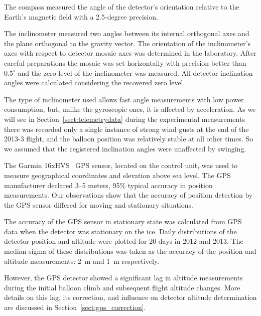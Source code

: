 \documentclass[universe,article,submit,moreauthors,pdftex]{Definitions/mdpi}
\begin{document}
The compass measured the angle of the detector's orientation relative to the Earth's magnetic field with a 2.5-degree precision.

The inclinometer measured two angles between its internal orthogonal axes and the plane orthogonal to the gravity vector. The orientation of the inclinometer's axes with respect to detector mosaic axes was determined in the laboratory. After careful preparations the mosaic was set horizontally with precision better than $0.5^\circ$ and the zero level of the inclinometer was measured. All detector inclination angles were calculated considering the recovered zero level.

The type of inclinometer used allows fast angle measurements with low power consumption, but, unlike the gyroscopic ones, it is affected by acceleration. As we will see in Section~\ref{sect:telemetrydata} during the experimental measurements there was recorded only a single instance of strong wind gusts at the end of the 2013-3 flight, and the balloon position was relatively stable at all other times. So we assumed that the registered inclination angles were unaffected by swinging.

The Garmin 16xHVS~\cite{GPS-module-specs} GPS sensor, located on the control unit, was used to measure geographical coordinates and elevation above sea level. The GPS manufacturer declared 3–5 meters, 95\% typical accuracy in position measurements. Our observations show that the accuracy of position detection by the GPS sensor differed for moving and stationary situations. 

The accuracy of the GPS sensor in stationary state was calculated from GPS data when the detector was stationary on the ice. Daily distributions of the detector position and altitude were plotted for 20 days in 2012 and 2013. The median sigma of these distributions was taken as the accuracy of the position and altitude measurements: 2~m and 1~m respectively.

However, the GPS detector showed a significant lag in altitude measurements during the initial balloon climb and subsequent flight altitude changes. More details on this lag, its correction, and influence on detector altitude determination are discussed in Section~\ref{sect:gps_correction}.
\end{document}
